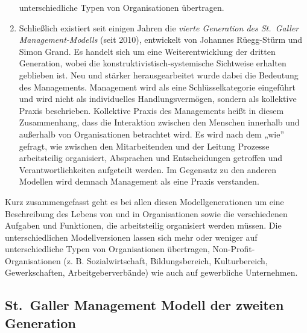 \documentclass[
  letterpaper,
]{book}
\begin{document}
\begin{enumerate}
  unterschiedliche Typen von Organisationen übertragen.
\item
  Schließlich existiert seit einigen Jahren die \emph{vierte Generation
  des St.~Galler Management-Modells} (seit 2010), entwickelt von
  Johannes Rüegg-Stürm und Simon Grand. Es handelt sich um eine
  Weiterentwicklung der dritten Generation, wobei die
  konstruktivistisch-systemische Sichtweise erhalten geblieben ist. Neu
  und stärker herausgearbeitet wurde dabei die Bedeutung des
  Managements. Management wird als eine Schlüsselkategorie eingeführt
  und wird nicht als individuelles Handlungsvermögen, sondern als
  kollektive Praxis beschrieben. Kollektive Praxis des Managements heißt
  in diesem Zusammenhang, dass die Interaktion zwischen den Menschen
  innerhalb und außerhalb von Organisationen betrachtet wird. Es wird
  nach dem „wie'' gefragt, wie zwischen den Mitarbeitenden und der
  Leitung Prozesse arbeitsteilig organisiert, Absprachen und
  Entscheidungen getroffen und Verantwortlichkeiten aufgeteilt werden.
  Im Gegensatz zu den anderen Modellen wird demnach Management als eine
  Praxis verstanden.
\end{enumerate}

Kurz zusammengefasst geht es bei allen diesen Modellgenerationen um eine
Beschreibung des Lebens von und in Organisationen sowie die
verschiedenen Aufgaben und Funktionen, die arbeitsteilig organisiert
werden müssen. Die unterschiedlichen Modellversionen lassen sich mehr
oder weniger auf unterschiedliche Typen von Organisationen übertragen,
Non-Profit-Organisationen (z. B. Sozialwirtschaft, Bildungsbereich,
Kulturbereich, Gewerkschaften, Arbeitgeberverbände) wie auch auf
gewerbliche Unternehmen.

\subsection{St.~Galler Management Modell der zweiten
Generation}\label{st-galler-management-modell-der-zweiten-generation}
\end{document}
